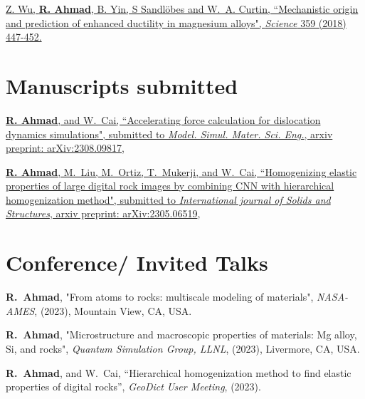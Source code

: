 \documentclass[margin,line]{resume}
\begin{document}
\begin{resume}
    \href{https://science.sciencemag.org/content/359/6374/447.full} {Z. Wu, \textbf{R. Ahmad}, B. Yin, S Sandlöbes and W.~A. Curtin, ``Mechanistic origin and prediction of enhanced ductility in magnesium alloys", \textit{Science} 359 (2018) 447-452.}

    \clearpage

    \section{\mysidestyle Manuscripts submitted}

    \href{https://arxiv.org/pdf/2308.09817}{\textbf{R. Ahmad}, and W.~Cai, ``Accelerating force calculation for dislocation dynamics simulations", submitted to \textit{Model. Simul. Mater. Sci. Eng.}, arxiv preprint: arXiv:2308.09817},

    \href{https://arxiv.org/pdf/2305.06519.pdf}{\textbf{R. Ahmad}, M.~Liu, M.~Ortiz, T.~Mukerji, and W.~Cai, ``Homogenizing elastic properties of large digital rock images by combining CNN with hierarchical homogenization method", submitted to \textit{International journal of Solids and Structures}, arxiv preprint: arXiv:2305.06519},




    \section{\mysidestyle Conference/ Invited Talks}
    \textbf{R.~Ahmad}, "From atoms to rocks: multiscale modeling of materials", \textit{NASA-AMES}, (2023), Mountain View, CA, USA.

    \textbf{R.~Ahmad}, "Microstructure and macroscopic properties of materials: Mg alloy, Si, and rocks", \textit{Quantum Simulation Group, LLNL}, (2023), Livermore, CA, USA.

    \textbf{R.~Ahmad}, and W.~Cai, ``Hierarchical homogenization method to find elastic properties of digital rocks'',  \textit{GeoDict User Meeting}, (2023).


\end{resume}
\end{document}
